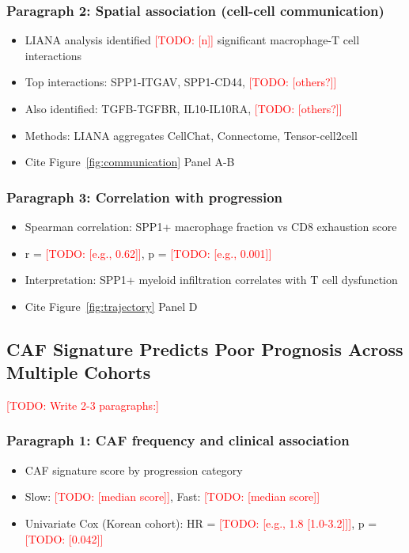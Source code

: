\documentclass[12pt,oneside]{article}
\newcommand{\TODO}[1]{\textcolor{red}{[TODO: #1]}}
\newcommand{\FIG}[1]{Figure~\ref{fig:#1}}
\begin{document}
\subsubsection*{Paragraph 2: Spatial association (cell-cell communication)}
\begin{itemize}
    \item LIANA analysis identified \TODO{[n]} significant macrophage-T cell interactions
    \item Top interactions: SPP1-ITGAV, SPP1-CD44, \TODO{[others?]}
    \item Also identified: TGFB-TGFBR, IL10-IL10RA, \TODO{[others?]}
    \item Methods: LIANA aggregates CellChat, Connectome, Tensor-cell2cell
    \item Cite \FIG{communication} Panel A-B
\end{itemize}

\subsubsection*{Paragraph 3: Correlation with progression}
\begin{itemize}
    \item Spearman correlation: SPP1+ macrophage fraction vs CD8 exhaustion score
    \item r = \TODO{[e.g., 0.62]}, p = \TODO{[e.g., 0.001]}
    \item Interpretation: SPP1+ myeloid infiltration correlates with T cell dysfunction
    \item Cite \FIG{trajectory} Panel D
\end{itemize}

\subsection{CAF Signature Predicts Poor Prognosis Across Multiple Cohorts}
\TODO{Write 2-3 paragraphs:}

\subsubsection*{Paragraph 1: CAF frequency and clinical association}
\begin{itemize}
    \item CAF signature score by progression category
    \item Slow: \TODO{[median score]}, Fast: \TODO{[median score]}
    \item Univariate Cox (Korean cohort): HR = \TODO{[e.g., 1.8 [1.0-3.2]]}, p = \TODO{[0.042]}
\end{itemize}
\end{document}
